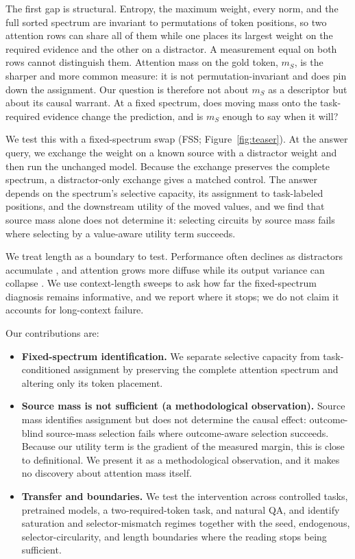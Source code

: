 \documentclass{article}
\begin{document}
The first gap is structural. Entropy, the maximum weight, every norm, and the full sorted spectrum are
invariant to permutations of token positions, so two attention rows can share all of them while one places its
largest weight on the required evidence and the other on a distractor. A measurement equal on both rows cannot
distinguish them. Attention mass on the gold token, $m_S$, is the sharper and more common measure: it is not
permutation-invariant and does pin down the assignment. Our question is therefore not about $m_S$ as a
descriptor but about its causal warrant. At a fixed spectrum, does moving mass onto the task-required evidence
change the prediction, and is $m_S$ enough to say when it will?

We test this with a fixed-spectrum swap (FSS; Figure~\ref{fig:teaser}). At the answer query, we exchange the
weight on a known source with a distractor weight and then run the unchanged model. Because the exchange preserves the complete
spectrum, a distractor-only exchange gives a matched control. The answer depends on the spectrum's selective
capacity, its assignment to task-labeled positions, and the downstream utility of the moved values, and we
find that source mass alone does not determine it: selecting circuits by source mass fails where selecting by a
value-aware utility term succeeds.

We treat length as a boundary to test. Performance often declines as distractors accumulate
\citep{kazemnejad,nopeentropy,sparselong}, and attention grows more diffuse while its output variance can
collapse \citep{vanishingvariance}. We use context-length sweeps to ask how far the fixed-spectrum diagnosis
remains informative, and we report where it stops; we do not claim it accounts for long-context failure.


Our contributions are:
\begin{itemize}
    \item \textbf{Fixed-spectrum identification.} We separate selective capacity from task-conditioned
    assignment by preserving the complete attention spectrum and altering only its token placement.
    \item \textbf{Source mass is not sufficient (a methodological observation).} Source mass identifies
    assignment but does not determine the causal effect: outcome-blind source-mass selection fails where
    outcome-aware selection succeeds. Because our utility term is the gradient of the measured margin, this is
    close to definitional. We present it as a methodological observation, and it makes no discovery about
    attention mass itself.
    \item \textbf{Transfer and boundaries.} We test the intervention across controlled tasks, pretrained models,
    a two-required-token task, and natural QA, and identify saturation and selector-mismatch regimes together
    with the seed, endogenous, selector-circularity, and length boundaries where the reading stops being
    sufficient.
\end{itemize}
\end{document}
